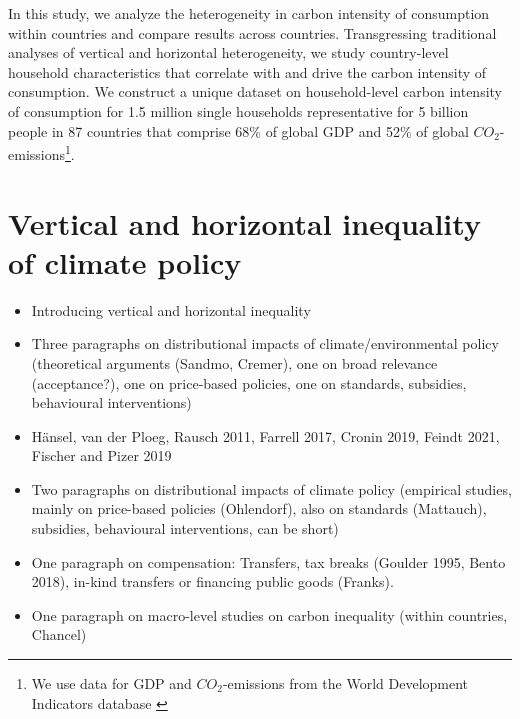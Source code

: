 \documentclass[12pt, a4paper]{article}
\begin{document}

In this study, we analyze the heterogeneity in carbon intensity of consumption within countries and compare results across countries. Transgressing traditional analyses of vertical and horizontal heterogeneity, we study country-level household characteristics that correlate with and drive the carbon intensity of consumption. We construct a unique dataset on household-level carbon intensity of consumption for 1.5 million single households representative for 5 billion people in 87 countries that comprise 68\% of global GDP and 52\% of global $CO_{2}$-emissions\footnote{We use data for GDP and $CO_{2}$-emissions from the World Development Indicators database \autocite{WorldBankGroup.2023}}.






\section{Vertical and horizontal inequality of climate policy} \label{sec:literature}

\begin{itemize}
  \item Introducing vertical and horizontal inequality
  \item Three paragraphs on distributional impacts of climate/environmental policy (theoretical arguments (Sandmo, Cremer), one on broad relevance (acceptance?), one on price-based policies, one on standards, subsidies, behavioural interventions)
  \item Hänsel, van der Ploeg, Rausch 2011, Farrell 2017, Cronin 2019, Feindt 2021, Fischer and Pizer 2019
  \item Two paragraphs on distributional impacts of climate policy (empirical studies, mainly on price-based policies (Ohlendorf), also on standards (Mattauch), subsidies, behavioural interventions, can be short)
  \item One paragraph on compensation: Transfers, tax breaks (Goulder 1995, Bento 2018), in-kind transfers or financing public goods (Franks).
  \item One paragraph on macro-level studies on carbon inequality (within countries, Chancel)

\end{itemize}
\end{document}
